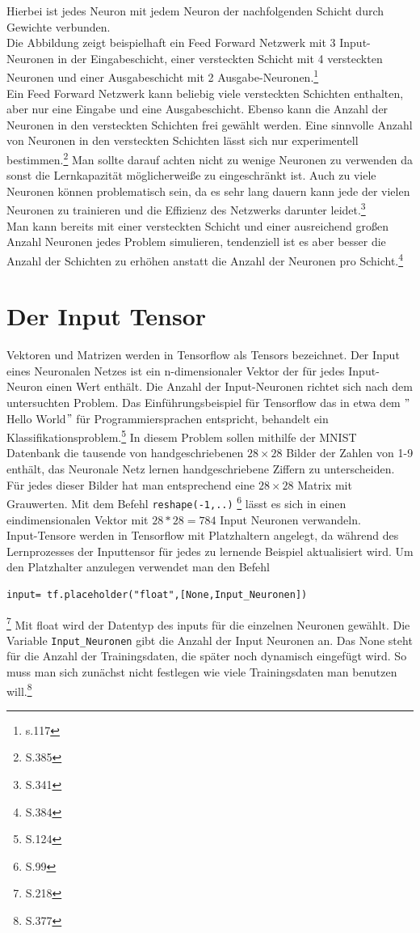 Hierbei ist jedes Neuron mit jedem Neuron der nachfolgenden Schicht durch Gewichte verbunden.\\
Die Abbildung zeigt beispielhaft ein Feed Forward Netzwerk mit 3 Input-Neuronen in der Eingabeschicht, einer versteckten Schicht mit 4 versteckten Neuronen und einer Ausgabeschicht mit 2 Ausgabe-Neuronen.\footnote{\cite{Bishop1995}s.117}\\
Ein Feed Forward Netzwerk kann beliebig viele versteckten Schichten enthalten, aber nur eine Eingabe und eine Ausgabeschicht. Ebenso kann die Anzahl der Neuronen in den versteckten Schichten frei gew\"ahlt werden. Eine sinnvolle Anzahl von Neuronen in den versteckten Schichten l\"asst sich nur experimentell bestimmen.\footnote{\cite{handson} S.385} Man sollte darauf achten nicht zu wenige Neuronen zu verwenden da sonst die Lernkapazit\"at m\"oglicherwei\ss e zu eingeschr\"ankt ist. Auch zu viele Neuronen k\"onnen problematisch sein, da es sehr lang dauern kann jede der vielen Neuronen zu trainieren und die Effizienz des Netzwerks darunter leidet.\footnote{\cite{Rashid} S.341}\\ Man kann bereits mit einer versteckten Schicht und einer ausreichend gro\ss en Anzahl Neuronen jedes Problem simulieren, tendenziell ist es aber besser die Anzahl der Schichten zu erh\"ohen anstatt die Anzahl der Neuronen pro Schicht.\footnote{\cite{handson} S.384}
\section{Der Input Tensor}
Vektoren und Matrizen werden in Tensorflow als Tensors bezeichnet. Der Input eines Neuronalen Netzes ist ein n-dimensionaler Vektor der f\"ur jedes Input-Neuron einen Wert enth\"alt. Die Anzahl der Input-Neuronen richtet sich nach dem untersuchten Problem. Das Einf\"uhrungsbeispiel f\"ur Tensorflow das in etwa dem $"$Hello World$"$ f\"ur Programmiersprachen entspricht, behandelt ein Klassifikationsproblem.\footnote{\cite{handson} S.124} In diesem Problem sollen mithilfe der MNIST Datenbank die tausende von handgeschriebenen $28 \times 28$ Bilder der Zahlen von 1-9 enth\"alt, das Neuronale Netz lernen handgeschriebene Ziffern zu unterscheiden. F\"ur jedes dieser Bilder hat man entsprechend eine $28 \times 28$ Matrix mit Grauwerten. Mit dem Befehl \lstinline$reshape(-1,..)$ \footnote{\cite{handson} S.99} l\"asst es sich in einen eindimensionalen Vektor mit  $28*28=784$ Input Neuronen verwandeln.\\
Input-Tensore werden in Tensorflow mit Platzhaltern angelegt, da w\"ahrend des Lernprozesses der Inputtensor f\"ur jedes zu lernende Beispiel aktualisiert wird. Um den Platzhalter anzulegen verwendet man den Befehl\begin{lstlisting}
input= tf.placeholder("float",[None,Input_Neuronen])
\end{lstlisting}\footnote{\cite{cookbook} S.218} 
Mit float wird der Datentyp des inputs f\"ur die einzelnen Neuronen gew\"ahlt. Die Variable \lstinline$Input_Neuronen$ gibt die Anzahl der Input Neuronen an. Das None steht f\"ur die Anzahl der Trainingsdaten, die sp\"ater noch dynamisch eingef\"ugt wird. So muss man sich zun\"achst nicht festlegen wie viele Trainingsdaten man benutzen will.\footnote{\cite{handson} S.377}

